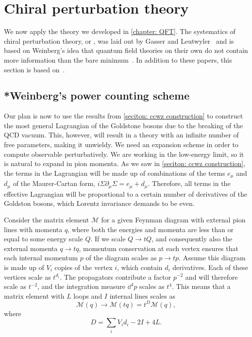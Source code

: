 \section{Chiral perturbation theory}
\label{section: chiral perturbation theory}

We now apply the theory we developed in \autoref{chapter: QFT}.
The systematics of chiral perturbation theory, or \chpt, was laid out by Gasser and Leutwyler~\autocite{gasserChiralPerturbationTheory1984,gasserChiralPerturbationTheory1985} and is based on Weinberg's idea that quantum field theories on their own do not contain more information than the bare minimum~\autocite{weinbergPhenomenologicalLagrangians1979a}.
In addition to these papers, this section is based on~\autocite{eckerChiralPerturbationTheory1995,fearingExtensionChiralPerturbation1996,schererIntroductionChiralPerturbation2002}.


\subsection{*Weinberg's power counting scheme}
\label{subsection: Weinberg's power counting scheme}


Our plan is now to use the results from \autoref{seciton: ccwz construction} to construct the most general Lagrangian of the Goldstone bosons due to the breaking of the QCD vacuum.
This, however, will result in a theory with an infinite number of free parameters, making it unwieldy.
We need an expansion scheme in order to compute observable perturbatively.
We are working in the low-energy limit, so it is natural to expand in pion momenta.
As we saw in \autoref{seciton: ccwz construction}, the terms in the Lagrangian will be made up of combinations of the terms $e_\mu$ and $d_\mu$ of the Maurer-Cartan form, $i\Sigma \partial_\mu \Sigma = e_\mu + d_\mu$.
Therefore, all terms in the effective Lagrangian will be proportional to a certain number of derivatives of the Goldston bosons, which Lorentz invariance demands to be even.

Consider the matrix element $\mathcal M$ for a given Feynman diagram with external pion lines with momenta $q$, where both the energies and momenta are less than or equal to some energy scale $Q$.
If we scale $Q\rightarrow tQ$, and consequently also the external momenta $q \rightarrow tq$, momentum conservation at each vertex ensures that each internal momentum $p$ of the diagram scales as $p \rightarrow tp$.
Assume this diagram is made up of $V_i$ copies of the vertex $i$, which contain $d_i$ derivatives.
Each of these vertices scale as $t^{d_i}$.
The propagators contribute a factor $p^{-2}$ and will therefore scale as $t^{-2}$, and the integration measure $\dd^4 p$ scales as $t^4$.
This means that a matrix element with $L$ loops and $I$ internal lines scales as
%
\begin{equation}
    \mathcal M(q) \rightarrow \mathcal M(t q) = t^D \mathcal M(q),
\end{equation}
%
where 
\begin{equation}
    D = \sum_i V_i d_i - 2 I + 4 L.
\end{equation}
%

